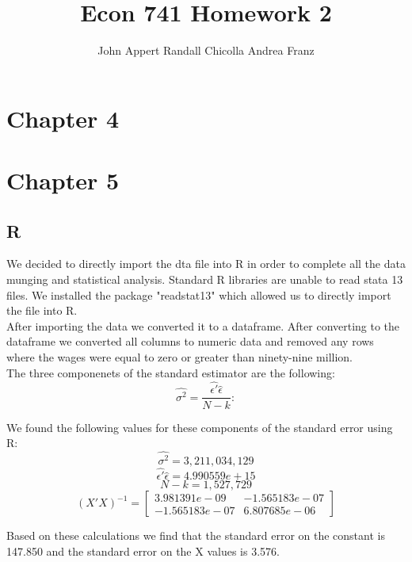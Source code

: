 \documentclass{article}
\begin{document}
\title{Econ 741 Homework 2}
\author{John Appert Randall Chicolla Andrea Franz}
\maketitle

\section{Chapter 4}

\section{Chapter 5}

\subsection{R}

We decided to directly import the dta file into R in order to complete all the data munging and statistical analysis.  Standard R libraries are unable to read stata 13 files.  We installed the package "readstat13" which allowed us to directly import the file into R.
\\

After importing the data we converted it to a dataframe.  After converting to the dataframe we converted all columns to numeric data and removed any rows where the wages were equal to zero or greater than ninety-nine million.  
\\

The three componenets of the standard estimator are the following:
\\


\begin{equation}
\hat{\sigma^2}=\frac{\hat{\epsilon'} \hat{\epsilon}}{N-k}:
\end{equation}

We found the following values for these components of the standard error using R:
\\
\begin{equation}
\hat{\sigma^2}=3,211,034,129
\end{equation}
\begin{equation}
\hat{\epsilon'}\hat{\epsilon}=4.990559e+15
\end{equation}
\begin{equation}
N-k=1,527,729
\end{equation}
\begin{equation}
(X'X)^{-1}=
\begin{bmatrix}

3.981391e-09 & -1.565183e-07 \\
-1.565183e-07 & 6.807685e-06
\end{bmatrix}

\end{equation}

Based on these calculations we find that the standard error on the constant is 147.850 and the standard error on the X values is 3.576.
\end{document}

